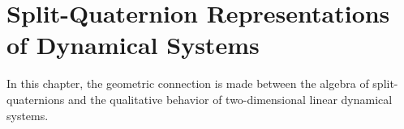 \chapter{Split-Quaternion Representations of Dynamical Systems}
\label{chap:quaternion}
In this chapter, the geometric connection is made between the algebra of split-quaternions and the qualitative behavior of two-dimensional linear dynamical systems. 





